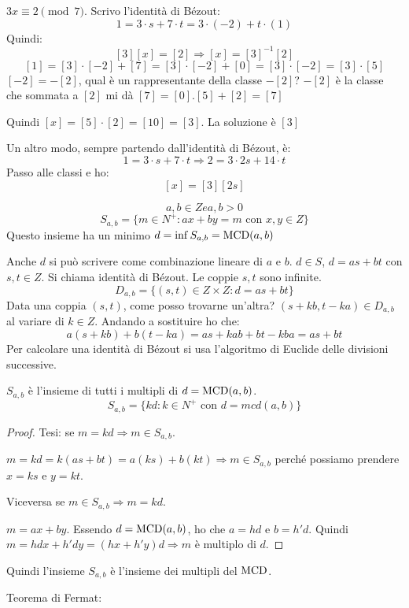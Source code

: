 \begin{exmp}
$3 x \equiv 2 \pmod{7}$. Scrivo l'identit\`a di B\'ezout:
\[
1 = 3 \cdot s + 7 \cdot t = 3 \cdot (-2) + t \cdot (1)
\]
Quindi:
\[
[3] [x] = [2] \Rightarrow [x] = [3]^{-1} [2]
\]
\[
[1] = [3] \cdot [-2] + [7] = [3] \cdot [-2] + [0] = [3] \cdot [-2] = [3] \cdot [5]
\]
$[-2] = -[2]$, qual \`e un rappresentante della classe $-[2]$? $-[2]$ \`e la classe che sommata a $[2]$ mi d\`a $[7] = [0]. [5] + [2] = [7]$

Quindi $[x] = [5] \cdot [2] = [10] = [3]$. La soluzione \`e $[3]$

Un altro modo, sempre partendo dall'identit\`a di B\'ezout, \`e:
\[
1 = 3 \cdot s + 7 \cdot t \Rightarrow 2 = 3 \cdot 2s + 14 \cdot t
\]
Passo alle classi e ho:
\[
[x] = [3] [2s]
\]
\end{exmp}
\[
a, b \in Z e a,b > 0
\]
\[
S_{a,b} =  \{m \in N^+ : ax + by = m \text{ con } x,y \in Z \}
\]
Questo insieme ha un minimo $d = \inf S_{a,b} = \operatorname{MCD}(a,b)$

Anche $d$ si pu\`o scrivere come combinazione lineare di $a$ e $b$. $d \in S$, $d = a s + b t$ con $s, t \in Z$. Si chiama identit\`a di B\'ezout. Le coppie $s, t$ sono infinite.
\[
D_{a,b} = \{ (s, t) \in Z \times Z : d = a s + b t \}
\]
Data una coppia $(s,t)$, come posso trovarne un'altra? $(s + k b, t - k a) \in D_{a,b}$ al variare di $k \in Z$. Andando a sostituire ho che:
\[
a (s + kb) + b(t - ka) = as + kab + bt -kba = as + bt
\]
Per calcolare una identit\`a di B\'ezout si usa l'algoritmo di Euclide delle divisioni successive.

\begin{prop}
$S_{a,b}$ \`e l'insieme di tutti i multipli di $d = \operatorname{MCD}(a,b)$.
\[
S_{a,b} = \{ k d : k \in N^+ \text{ con } d = mcd(a,b) \}
\]
\end{prop}
\begin{proof}
Tesi: se $m = kd \Rightarrow m \in S_{a,b}$.

$m = k d = k (as + bt) = a (ks) + b (kt) \Rightarrow m \in S_{a,b}$ perch\'e possiamo prendere $x = ks$ e $y = kt$.

Viceversa se $m \in S_{a,b} \Rightarrow m = kd$.

$m = ax + by$. Essendo $d = \operatorname{MCD}(a,b)$, ho che $a = hd$ e $b = h' d$. Quindi $m = hdx + h'dy = (hx + h'y) d \Rightarrow m$ \`e multiplo di $d$.
\end{proof}
Quindi l'insieme $S_{a,b}$ \`e l'insieme dei multipli del $\operatorname{MCD}$.

Teorema di Fermat:

